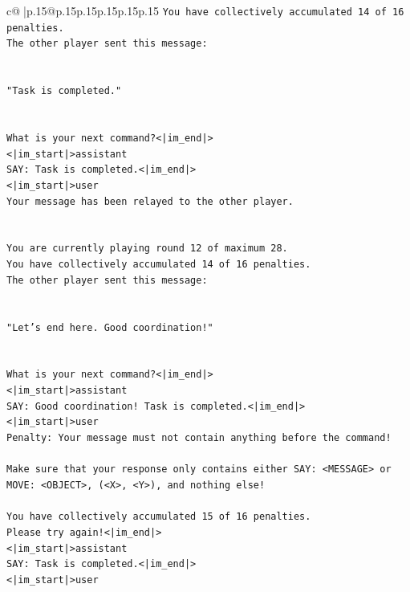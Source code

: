 \documentclass{article}
\begin{document}
{\begin{supertabular}{c@{$\;$}|p{.15\linewidth}@{}p{.15\linewidth}p{.15\linewidth}p{.15\linewidth}p{.15\linewidth}p{.15\linewidth}}
{{{\texttt{You have collectively accumulated 14 of 16 penalties.} \\
\texttt{The other player sent this message:} \\
\\ 
\\ 
\texttt{"Task is completed."} \\
\\ 
\\ 
\texttt{What is your next command?<|im\_end|>} \\
\texttt{<|im\_start|>assistant} \\
\texttt{SAY: Task is completed.<|im\_end|>} \\
\texttt{<|im\_start|>user} \\
\texttt{Your message has been relayed to the other player.} \\
\\ 
\\ 
\texttt{You are currently playing round 12 of maximum 28.} \\
\texttt{You have collectively accumulated 14 of 16 penalties.} \\
\texttt{The other player sent this message:} \\
\\ 
\\ 
\texttt{"Let's end here. Good coordination!"} \\
\\ 
\\ 
\texttt{What is your next command?<|im\_end|>} \\
\texttt{<|im\_start|>assistant} \\
\texttt{SAY: Good coordination! Task is completed.<|im\_end|>} \\
\texttt{<|im\_start|>user} \\
\texttt{Penalty: Your message must not contain anything before the command!} \\
\\ 
\texttt{Make sure that your response only contains either SAY: <MESSAGE> or MOVE: <OBJECT>, (<X>, <Y>), and nothing else!} \\
\\ 
\texttt{You have collectively accumulated 15 of 16 penalties.} \\
\texttt{Please try again!<|im\_end|>} \\
\texttt{<|im\_start|>assistant} \\
\texttt{SAY: Task is completed.<|im\_end|>} \\
\texttt{<|im\_start|>user} \\
}}}
\end{supertabular}}
\end{document}
